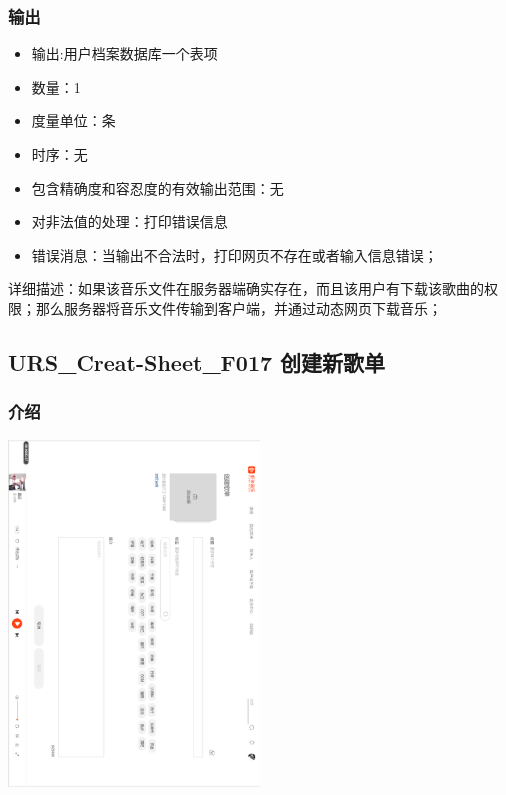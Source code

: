 			\subsubsection{输出}
			\begin{itemize}
				\item	输出:用户档案数据库一个表项
				\item	数量：1
				\item	度量单位：条
				\item	时序：无
				\item	包含精确度和容忍度的有效输出范围：无
				\item	对非法值的处理：打印错误信息
				\item	错误消息：当输出不合法时，打印网页不存在或者输入信息错误；
			   \end{itemize}
			   详细描述：如果该音乐文件在服务器端确实存在，而且该用户有下载该歌曲的权限；那么服务器将音乐文件传输到客户端，并通过动态网页下载音乐；






			   \subsection{URS\_Creat-Sheet\_F017 创建新歌单}
			   \subsubsection{介绍}
			   
			   \begin{center}
				\begin{sideways} 
			   \includegraphics[width=0.5\textwidth]{./figures/capture16.png} 
				\end{sideways}
			\end{center}

